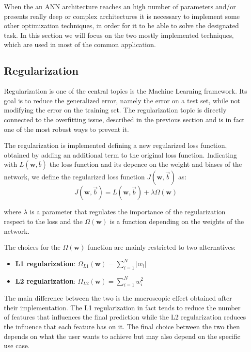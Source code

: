When the an ANN architecture reaches an high number of parameters and/or  presents really deep or complex architectures it is necessary to implement some other optimization techniques, in order for it to be able to solve the designated task. In this section we will focus on the two mostly implemented techniques, which are used in most of the common application.

\subsection{Regularization}\label{regularization}

Regularization is one of the central topics is the Machine Learning framework. Its goal is to reduce the generalized error, namely the error on a test set, while not modifying the error on the training set. The regularization topic is directly connected to the overfitting issue, described in the previous section and is in fact one of the most robust ways to prevent it. 

The regularization is implemented defining a new regularized loss function, obtained by adding an additional term to the original loss function. Indicating with $L(\boldsymbol{w},\bar{b})$ the loss function and its depence on the weight and biases of the network, we define the regularized loss function $J(\mathbf{w}, \vec{b})$ as:
\begin{equation}
J(\mathbf{w}, \vec{b})=L(\mathbf{w}, \vec{b})+ \lambda\Omega(\mathbf{w})
\end{equation}

where $\lambda$ is a parameter that regulates the importance of the regularization respect to the loss and the $\Omega(\mathbf{w})$ is a function depending on the weights of the network. 

The choices for the $\Omega(\mathbf{w})$ function are mainly restricted to two alternatives:
\begin{itemize}
    \item \textbf{L1 regularization}: $\Omega_{L1}(\mathbf{w}) = \sum_{i=1}^N |w_i|$
    \item \textbf{L2 regularization}: $\Omega_{L2}(\mathbf{w}) = \sum_{i=1}^N w_i^2$
\end{itemize}

The main difference between the two is the macroscopic effect obtained after their implementation. The L1 regularization in fact tends to reduce the number of features that influences the final prediction while the L2 regularization reduces the influence that each feature has on it. The final choice between the two then depends on what the user wants to achieve but may also depend on the specific use case\cite{l1reg,l2reg}.


